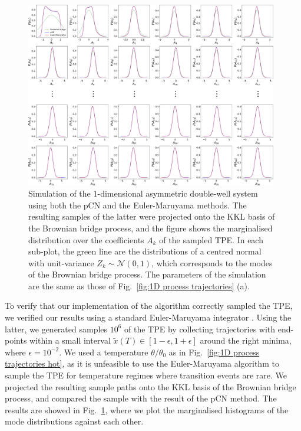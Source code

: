 \begin{figure}[t]
\includegraphics[width=0.98\textwidth]{figs_part1/mcmc/1D_process_MCMC_vs_Langevin}
\centering \caption{Simulation of the $1$-dimensional asymmetric double-well system using both the pCN and the Euler-Maruyama methods. The resulting samples of the latter were projected onto the KKL basis of the Brownian bridge process, and the figure shows the marginalised distribution over the coefficients $A_k$ of the sampled TPE. In each sub-plot, the green line are the distributions of a centred normal with unit-variance $Z_k \sim \mathcal{N}(0,1)$, which corresponds to the modes of the Brownian bridge process. The parameters of the simulation are the same as those of Fig.~\ref{fig:1D process trajectories} (a).}
\label{fig:1D process MCMC vs Euler-Maruyama} 
\end{figure}

To verify that our implementation of the algorithm correctly sampled the TPE, we verified our results using a standard Euler-Maruyama integrator \citep{kloedenNumericalSolutionStochastic2011}. Using the latter, we generated samples $10^6$ of the TPE by collecting trajectories
with end-points within a small interval $\tilde{x}(T)\in[1-\epsilon,1+\epsilon]$
around the right minima, where $\epsilon=10^{-2}$. We used a temperature $\theta / \theta_0$ as in Fig.~\ref{fig:1D process trajectories hot}, as it is unfeasible to use the Euler-Maruyama algorithm to sample the TPE for temperature regimes where transition events are rare. We projected the resulting sample paths onto the KKL basis of the Brownian bridge process, and compared the sample with the result of the pCN method. The results are showed in Fig.~\ref{fig:1D process MCMC vs Euler-Maruyama}, where we plot the marginalised histograms of the mode distributions against each other.


